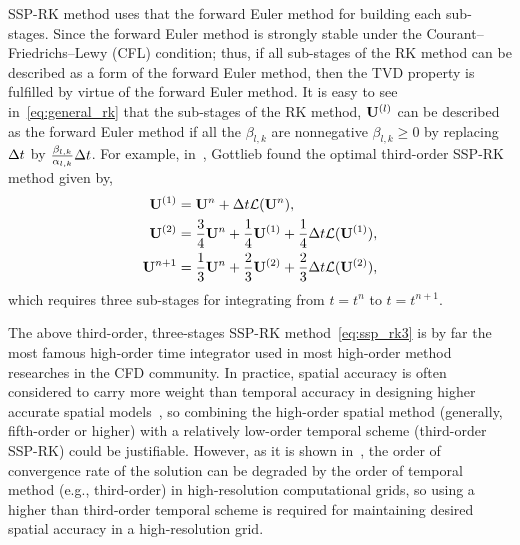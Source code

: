 SSP-RK method uses that the forward Euler method for building each sub-stages.
Since the forward Euler method is strongly stable under the Courant–Friedrichs–Lewy (CFL) condition;
thus, if all sub-stages of the RK method can be described as a form of the forward Euler method,
then the TVD property is fulfilled by virtue of the forward Euler method.
It is easy to see in~\cref{eq:general_rk} that the sub-stages of the RK method, \( \mathbf{U}^{(l)} \)
can be described as the forward Euler method if all the \( \beta_{l, k} \) are nonnegative \( \beta_{l, k} \geq 0 \)
by replacing \( \Delta t \) by \( \frac{\beta_{l, k}}{\alpha_{l, k}} \Delta t \).
For example, in~\cite{gottlieb1998total}, Gottlieb found the optimal third-order
SSP-RK method given by,
\begin{equation}\label{eq:ssp_rk3}
    \begin{split}
        \mathbf{U}^{(1)} &= \mathbf{U}^{n} + \Delta t \mathcal{L}(\mathbf{U}^{n}), \\
        \mathbf{U}^{(2)} &= \frac{3}{4} \mathbf{U}^{n} + \frac{1}{4} \mathbf{U}^{(1)} + \frac{1}{4} \Delta t \mathcal{L}(\mathbf{U}^{(1)}), \\
        \mathbf{U}^{n + 1} &= \frac{1}{3} \mathbf{U}^{n} + \frac{2}{3} \mathbf{U}^{(2)} + \frac{2}{3} \Delta t \mathcal{L}(\mathbf{U}^{(2)}),
    \end{split}
\end{equation}
which requires three sub-stages for integrating from \( t = t^{n} \) to \( t = t^{n + 1} \).

The above third-order, three-stages SSP-RK method~\cref{eq:ssp_rk3} is by far
the most famous high-order time integrator used in most high-order method researches in the CFD community.
In practice, spatial accuracy is often considered to carry more weight than temporal accuracy
in designing higher accurate spatial models~\cite{balsara2000monotonicity,mignone2010high},
so combining the high-order spatial method (generally, fifth-order or higher)
with a relatively low-order temporal scheme (third-order SSP-RK) could be justifiable.
However, as it is shown in~\cite{lee2021recursive}, the order of convergence rate of the solution
can be degraded by the order of temporal method (e.g., third-order) in high-resolution computational grids,
so using a higher than third-order temporal scheme is required for maintaining desired spatial accuracy in a high-resolution grid.

